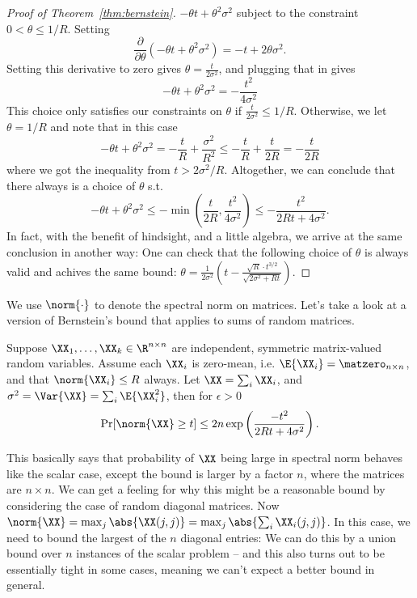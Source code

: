 \begin{proof}[Proof of Theorem~\ref{thm:bernstein}]
$-\theta t + \theta^2 \sigma^2$ subject to the constraint
$0< \theta \leq 1/R$.
Setting
\[ \frac{\partial}{\partial \theta}\left(
    -\theta t + \theta^2
    \sigma^2
  \right)
  = - t + 2 \theta \sigma^2
  .
\]
Setting this derivative to zero gives
$\theta = \frac{t}{2\sigma^2}$,
and plugging that in gives
\[
    -\theta t + \theta^2\sigma^2
    =
    -\frac{t^2}{4\sigma^2}
  \]
This choice only satisfies our constraints on $\theta$ if
$\frac{t}{2\sigma^2} \leq 1/R$.
Otherwise, we let $\theta =  1/R$ and note that in this case
\[
    -\theta t + \theta^2\sigma^2
    =
    -\frac{t}{R} + \frac{\sigma^2}{R^2}
    \leq
    -\frac{t}{R} + \frac{t}{2R}
    =
    -\frac{t}{2R}
  \]
  where we got the inequality from $t > 2\sigma^2/R$.
  Altogether, we can conclude that there always is a choice of
  $\theta$ s.t.
  \[
    -\theta t + \theta^2\sigma^2
    \leq
    - \min\left( \frac{t}{2R} , \frac{t^2}{4\sigma^2} \right)
    \leq
    - \frac{t^2}{2Rt + 4\sigma^2}
    .
  \]
  In fact, with the benefit of hindsight, and a little algebra, we
  arrive at the same conclusion in another way:
  One
  can check that the
  following choice of $\theta$ is always valid and achives the same
  bound:
  $\theta = \frac{1}{2
    \sigma^2}\left( t - \frac{\sqrt{R} \cdot t^{3/2}}{\sqrt{2\sigma^2 + R
        t}} \right)$.
\end{proof}
We use $\norm{\cdot}$ to denote the spectral norm on matrices.
Let's take a look at a version of Bernstein's bound that applies to
sums of random matrices.
\begin{theorem}
  \label{thm:matbernstein}
  Suppose $\XX_1, \ldots, \XX_k \in \R^{n \times n}$ are independent,
  symmetric matrix-valued
  random variables.
Assume each $\XX_i$ is zero-mean, i.e. $\E{\XX_i} = \matzero_{n \times
  n}$, and that $\norm{\XX_i} \leq R$ always.
Let $\XX = \sum_i \XX_i$, and $\sigma^2 = \Var{\XX} = \sum_i \E{\XX_i^2}$,
then for $\epsilon > 0$
\[
\Pr[ \norm{\XX} \geq t] \leq 2n\exp\left(\frac{-t^2}{2Rt + 4\sigma^2}\right)
.
\]
\end{theorem}
This basically says that probability of $\XX$ being large in spectral
norm behaves like the scalar case, except the bound is larger by a factor
$n$, where the matrices are $n \times n$.
We can get a feeling for why this might be a reasonable bound by
considering the case of random diagonal matrices.
Now $\norm{\XX} = \max_j \abs{\XX (j,j)} = \max_j \abs{\sum_i
  \XX_i(j,j)}$.
In this case, we need to bound the largest of the $n$ diagonal
entries: We can do this by a union bound over $n$ instances of the
scalar problem -- and this also turns out to be essentially tight in some cases,
meaning we can't expect a better bound in general.

